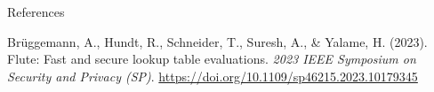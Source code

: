 \documentclass[../240906_cryptlab_flute.tex]{subfiles}
\begin{document}
\begin{frame}{References}
    \begin{itemize}
        \ii
        Brüggemann, A., Hundt, R., Schneider, T., Suresh, A., \& Yalame, H. (2023). Flute: Fast and
        secure lookup table evaluations. \textit{2023 IEEE Symposium on Security and Privacy (SP)}.
        \url{https://doi.org/10.1109/sp46215.2023.10179345}
    \end{itemize}
\end{frame}
\end{document}
